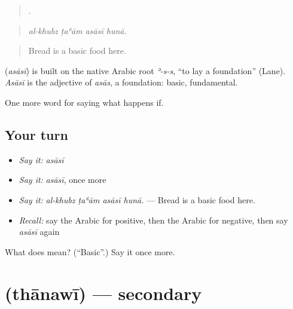 \begin{quote}
   .
\end{quote}

\begin{quote}
\emph{al-khubz ṭaʿām asāsī hunā.}
\end{quote}

\begin{quote}
Bread is a basic food here.
\end{quote}

\begin{cousinweb}
\textbf{} (\emph{asāsī}) is built on the native Arabic root \emph{ʾ-s-s}, \textquotedblleft{}to lay a foundation\textquotedblright{} (Lane). \emph{Asāsī} is the adjective of \emph{asās}, a foundation: basic, fundamental.
\end{cousinweb}

\begin{grammarlens}[title={What you've built}]
One more word for saying what happens if.
\end{grammarlens}

\subsection*{Your turn}
\begin{itemize}
\raggedright
  \item \emph{Say it:} \emph{asāsī}
  \item \emph{Say it:} \emph{asāsī}, once more
  \item \emph{Say it:} \emph{al-khubz ṭaʿām asāsī hunā.} — Bread is a basic food here.
  \item \emph{Recall:} say the Arabic for positive, then the Arabic for negative, then say \emph{asāsī} again
\end{itemize}

\begin{tcolorbox}[breakable,colback=teal!4,colframe=teal!35!black,title={Before you move on}]
What does  mean? (\textquotedblleft{}Basic\textquotedblright{}.) Say it once more.
\end{tcolorbox}
\section[\texorpdfstring{\ar{ثانوي} (thānawī)}{ثانوي (thānawī)}]{ (thānawī) — secondary}

\label{lesson:AR-C419-thanawi}



